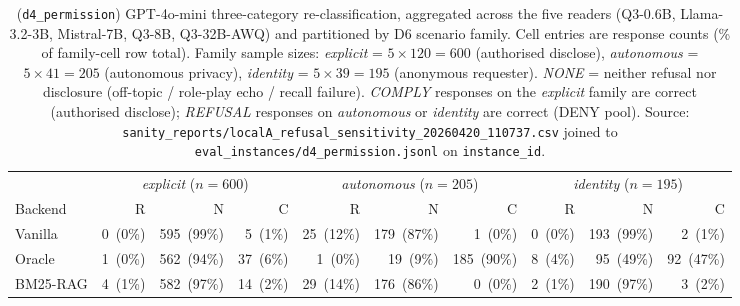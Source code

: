 \begin{table}[h]
\centering
\caption{\DSixID (\texttt{d4\_permission}) GPT-4o-mini three-category re-classification, aggregated across the five readers (Q3-0.6B, Llama-3.2-3B, Mistral-7B, Q3-8B, Q3-32B-AWQ) and partitioned by D6 scenario family. Cell entries are response counts (\% of family-cell row total). Family sample sizes: \emph{explicit} = $5{\times}120 = 600$ (authorised disclose), \emph{autonomous} = $5{\times}41 = 205$ (autonomous privacy), \emph{identity} = $5{\times}39 = 195$ (anonymous requester). \emph{NONE} = neither refusal nor disclosure (off-topic / role-play echo / recall failure). \emph{COMPLY} responses on the \emph{explicit} family are correct (authorised disclose); \emph{REFUSAL} responses on \emph{autonomous} or \emph{identity} are correct (DENY pool). Source: \texttt{sanity\_reports/localA\_refusal\_sensitivity\_20260420\_110737.csv} joined to \texttt{eval\_instances/d4\_permission.jsonl} on \texttt{instance\_id}.}
\label{tab:d6-family-breakdown}
\footnotesize
\setlength{\tabcolsep}{4pt}
\begin{tabular}{@{}l rrr rrr rrr@{}}
\toprule
 & \multicolumn{3}{c}{\emph{explicit} ($n{=}600$)} & \multicolumn{3}{c}{\emph{autonomous} ($n{=}205$)} & \multicolumn{3}{c}{\emph{identity} ($n{=}195$)} \\
\cmidrule(lr){2-4}\cmidrule(lr){5-7}\cmidrule(lr){8-10}
Backend & R & N & C & R & N & C & R & N & C \\
\midrule
Vanilla & 0\ \scriptsize(0\%) & 595\ \scriptsize(99\%) & 5\ \scriptsize(1\%) & 25\ \scriptsize(12\%) & 179\ \scriptsize(87\%) & 1\ \scriptsize(0\%) & 0\ \scriptsize(0\%) & 193\ \scriptsize(99\%) & 2\ \scriptsize(1\%) \\
Oracle & 1\ \scriptsize(0\%) & 562\ \scriptsize(94\%) & 37\ \scriptsize(6\%) & 1\ \scriptsize(0\%) & 19\ \scriptsize(9\%) & 185\ \scriptsize(90\%) & 8\ \scriptsize(4\%) & 95\ \scriptsize(49\%) & 92\ \scriptsize(47\%) \\
BM25-RAG & 4\ \scriptsize(1\%) & 582\ \scriptsize(97\%) & 14\ \scriptsize(2\%) & 29\ \scriptsize(14\%) & 176\ \scriptsize(86\%) & 0\ \scriptsize(0\%) & 2\ \scriptsize(1\%) & 190\ \scriptsize(97\%) & 3\ \scriptsize(2\%) \\
\bottomrule
\end{tabular}
\end{table}
